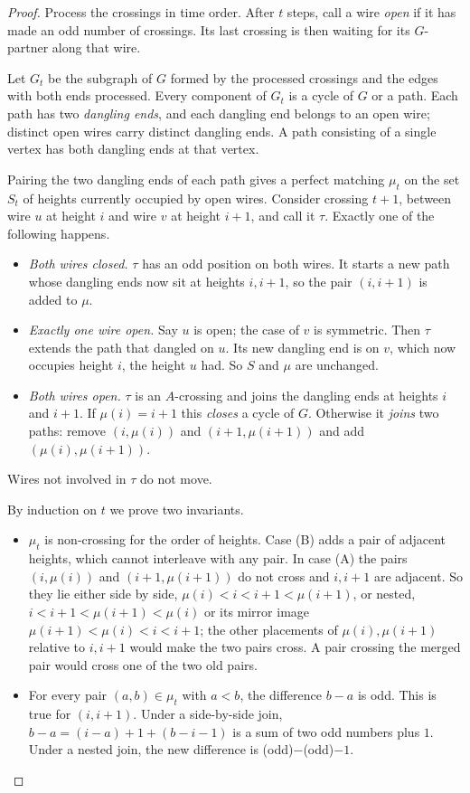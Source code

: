 \begin{proof}
Process the crossings in time order. After $t$ steps, call a wire \emph{open} if it has made an odd
number of crossings. Its last crossing is then waiting for its $G$-partner along that wire.

Let $G_t$ be the subgraph of $G$ formed by the processed crossings and the edges with both ends
processed. Every component of $G_t$ is a cycle of $G$ or a path. Each path has two \emph{dangling
ends}, and each dangling end belongs to an open wire; distinct open wires carry distinct dangling
ends. A path consisting of a single vertex has both dangling ends at that vertex.

Pairing the two dangling ends of each path gives a perfect matching $\mu_t$ on the set $S_t$ of heights
currently occupied by open wires. Consider crossing $t+1$, between wire $u$ at height $i$ and wire $v$
at height $i+1$, and call it $\tau$. Exactly one of the following happens.
\begin{itemize}
\item[(B)] \emph{Both wires closed.} $\tau$ has an odd position on both wires. It starts a new path
  whose dangling ends now sit at heights $i,i+1$, so the pair $(i,i+1)$ is added to $\mu$.
\item[(C)] \emph{Exactly one wire open.} Say $u$ is open; the case of $v$ is symmetric. Then $\tau$
  extends the path that dangled on $u$. Its new dangling end is on $v$, which now occupies height $i$,
  the height $u$ had. So $S$ and $\mu$ are unchanged.
\item[(A)] \emph{Both wires open.} $\tau$ is an $A$-crossing and joins the dangling ends at heights $i$
  and $i+1$. If $\mu(i)=i+1$ this \emph{closes} a cycle of $G$. Otherwise it \emph{joins} two paths:
  remove $(i,\mu(i))$ and $(i+1,\mu(i+1))$ and add $(\mu(i),\mu(i+1))$.
\end{itemize}
Wires not involved in $\tau$ do not move.

By induction on $t$ we prove two invariants.
\begin{itemize}
\item[(I1)] $\mu_t$ is non-crossing for the order of heights. Case (B) adds a pair of adjacent heights,
  which cannot interleave with any pair. In case (A) the pairs $(i,\mu(i))$ and $(i+1,\mu(i+1))$ do not
  cross and $i,i+1$ are adjacent. So they lie either side by side,
  $\mu(i)<i<i+1<\mu(i+1)$, or nested, $i<i+1<\mu(i+1)<\mu(i)$ or its mirror image
  $\mu(i+1)<\mu(i)<i<i+1$; the other placements of $\mu(i),\mu(i+1)$ relative to $i,i+1$ would make the
  two pairs cross. A pair crossing the merged pair would cross one of the two old pairs.
\item[(I2)] For every pair $(a,b)\in\mu_t$ with $a<b$, the difference $b-a$ is odd. This is true for
  $(i,i+1)$. Under a side-by-side join, $b-a=(i-a)+1+(b-i-1)$ is a sum of two odd numbers plus $1$.
  Under a nested join, the new difference is (odd)$-$(odd)$-1$.
\end{itemize}


\end{proof}
